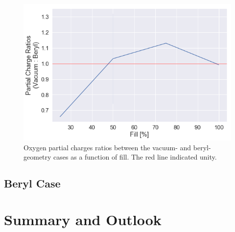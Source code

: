         \begin{figure}
            \centering
            \includegraphics[width=0.9\linewidth]{Figures/System/pc_vacuum_pc_ratios.png}
            \caption{Oxygen partial charges ratios between the vacuum- and beryl-geometry cases as a function of fill. The red line indicated unity.}
            \label{fig:pc_vacuum_pc_ratios}
        \end{figure}
        
        
        \subsection{Beryl Case}
        
        
    \section{Summary and Outlook}
